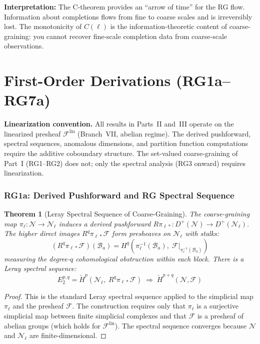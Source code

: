 \documentclass[11pt,letterpaper]{article}
\newtheorem{theorem}[conjecture]{Theorem}
\newcommand{\Hcech}{\check{H}}
\newcommand{\sheaf}{\mathcal{F}}
\newcommand{\nerve}{\mathcal{N}}
\newcommand{\block}{\mathcal{B}}
\begin{document}
\textbf{Interpretation:} The C-theorem provides an ``arrow of 
time'' for the RG flow. Information about completions flows 
from fine to coarse scales and is irreversibly lost. The 
monotonicity of $C(\ell)$ is the information-theoretic content of 
coarse-graining: you cannot recover fine-scale completion data from 
coarse-scale observations.

\newpage
\part{First-Order Derivations (RG1a--RG7a)}

\noindent
\textbf{Linearization convention.} All results in Parts~II and~III 
operate on the linearized presheaf $\sheaf^{\mathrm{lin}}$ 
(Branch~VII, abelian regime). The derived pushforward, spectral 
sequences, anomalous dimensions, and partition function computations 
require the additive coboundary structure. The set-valued 
coarse-graining of Part~I (RG1--RG2) does not; only the spectral 
analysis (RG3 onward) requires linearization.

\section{RG1a: Derived Pushforward and RG Spectral Sequence}

\begin{theorem}[Leray Spectral Sequence of 
Coarse-Graining]\label{thm:leray_rg}
The coarse-graining map $\pi_\ell : \nerve \to \nerve_\ell$ induces 
a derived pushforward $R\pi_{\ell *} : D^+(\nerve) \to 
D^+(\nerve_\ell)$. The higher direct images $R^q \pi_{\ell *} 
\sheaf$ form presheaves on $\nerve_\ell$ with stalks:
\begin{equation}\label{eq:higher_direct}
    (R^q \pi_{\ell *} \sheaf)(\block_a) 
    = H^q\!\left(\pi_\ell^{-1}(\block_a),\; 
    \sheaf\big|_{\pi_\ell^{-1}(\block_a)}\right)
\end{equation}
measuring the degree-$q$ cohomological obstruction within each 
block. There is a Leray spectral sequence:
\begin{equation}\label{eq:leray}
    E_2^{p,q} = \Hcech^p(\nerve_\ell,\; R^q \pi_{\ell *} \sheaf) 
    \;\Longrightarrow\; \Hcech^{p+q}(\nerve, \sheaf)
\end{equation}
\end{theorem}

\begin{proof}
This is the standard Leray spectral sequence applied to the 
simplicial map $\pi_\ell$ and the presheaf $\sheaf$. The 
construction requires only that $\pi_\ell$ is a surjective 
simplicial map between finite simplicial complexes and that 
$\sheaf$ is a presheaf of abelian groups (which holds for 
$\sheaf^{\mathrm{lin}}$). The spectral sequence converges because 
$\nerve$ and $\nerve_\ell$ are finite-dimensional.
\end{proof}
\end{document}
